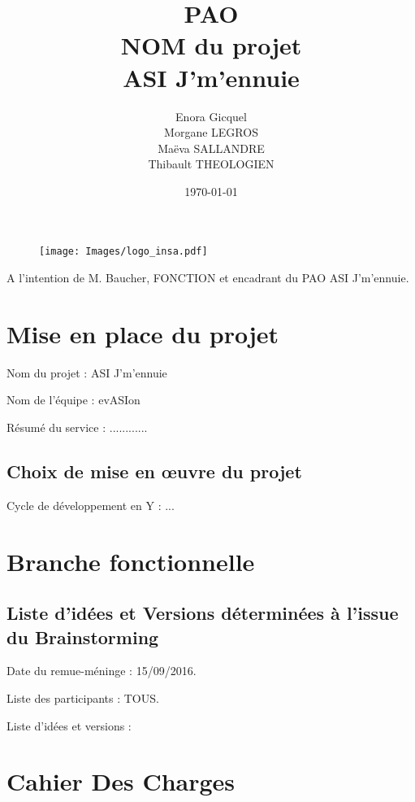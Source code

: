 \documentclass[a4paper,12pt]{article}
\title{PAO\\ \huge NOM du projet\\ASI J'm'ennuie}
\author{Enora Gicquel\\Morgane LEGROS\\Maëva SALLANDRE\\Thibault THEOLOGIEN}
\date{\today}
\begin{document}
\begin{titlepage}
\vfill
	\begin{figure}
	\texttt{[image: Images/logo\_insa.pdf]}
	\end{figure}

\maketitle

A l'intention de M. Baucher, FONCTION et encadrant du PAO ASI J'm'ennuie.
\vfill
\noindent \hrulefill

\end{titlepage}



\newpage
\tableofcontents
\newpage

\section{Mise en place du projet}

Nom du projet : ASI J'm'ennuie

Nom de l'équipe : evASIon

Résumé du service : ............

\subsection{Choix de mise en œuvre du projet}

Cycle de développement en Y : ...

\section{Branche fonctionnelle}

\subsection{Liste d'idées et Versions déterminées à l'issue du Brainstorming}

Date du remue-méninge : 15/09/2016.

Liste des participants : TOUS.

Liste d'idées et versions :



\section{Cahier Des Charges}


\end{document}

